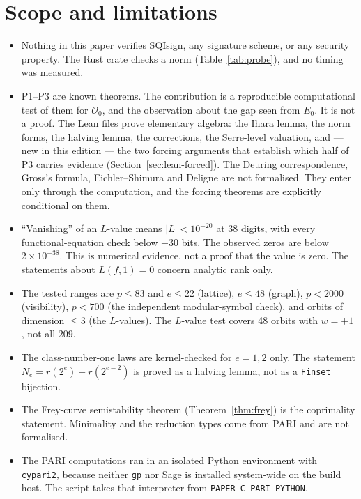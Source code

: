 \documentclass[11pt,a4paper]{article}
\theoremstyle{definition}
\newcommand{\Oz}{\mathcal{O}_0}
\begin{document}
\section{Scope and limitations}
\label{sec:scope}
\begin{itemize}
  \item Nothing in this paper verifies SQIsign, any signature scheme, or any security property. The Rust crate checks a norm (Table~\ref{tab:probe}), and no timing was measured.
  \item P1--P3 are known theorems. The contribution is a reproducible computational test of them for $\Oz$, and the observation about the gap seen from $E_0$. It is not a proof. The Lean files prove elementary algebra: the Ihara lemma, the norm forms, the halving lemma, the corrections, the Serre-level valuation, and --- new in this edition --- the two forcing arguments that establish which half of P3 carries evidence (Section~\ref{sec:lean-forced}). The Deuring correspondence, Gross's formula, Eichler--Shimura and Deligne are not formalised. They enter only through the computation, and the forcing theorems are explicitly conditional on them.
  \item ``Vanishing'' of an $L$-value means $|L|<10^{-20}$ at 38 digits, with every functional-equation check below $-30$ bits. The observed zeros are below $2\times10^{-38}$. This is numerical evidence, not a proof that the value is zero. The statements about $L(f,1)=0$ concern analytic rank only.
  \item The tested ranges are $p\le83$ and $e\le22$ (lattice), $e\le48$ (graph), $p<2000$ (visibility), $p<700$ (the independent modular-symbol check), and orbits of dimension $\le3$ (the $L$-values). The $L$-value test covers 48 orbits with $w=+1$, not all 209.
  \item The class-number-one laws are kernel-checked for $e=1,2$ only. The statement $N_e=r(2^e)-r(2^{e-2})$ is proved as a halving lemma, not as a \texttt{Finset} bijection.
  \item The Frey-curve semistability theorem (Theorem~\ref{thm:frey}) is the coprimality statement. Minimality and the reduction types come from PARI and are not formalised.
  \item The PARI computations ran in an isolated Python environment with \texttt{cypari2}, because neither \texttt{gp} nor Sage is installed system-wide on the build host. The script takes that interpreter from \texttt{PAPER\_C\_PARI\_PYTHON}.
\end{itemize}
\end{document}
